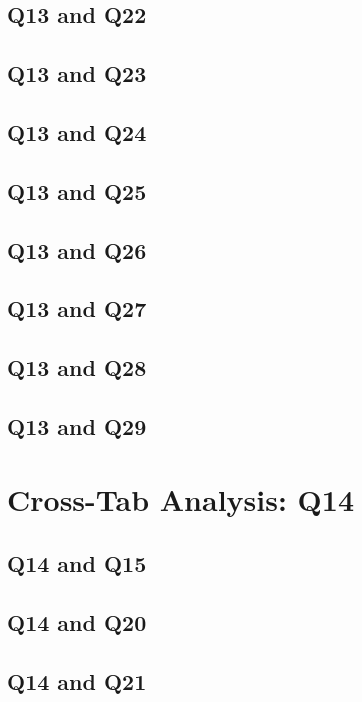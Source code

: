 \documentclass{report}
\begin{document}
\section{Q13 and Q22}\clearpage
\section{Q13 and Q23}\clearpage
\section{Q13 and Q24}\clearpage
\section{Q13 and Q25}\clearpage
\section{Q13 and Q26}\clearpage
\section{Q13 and Q27}\clearpage
\section{Q13 and Q28}\clearpage
\section{Q13 and Q29}\clearpage

\chapter{Cross-Tab Analysis: Q14}

\section{Q14 and Q15}\clearpage
\section{Q14 and Q20}\clearpage
\section{Q14 and Q21}\clearpage
\end{document}
